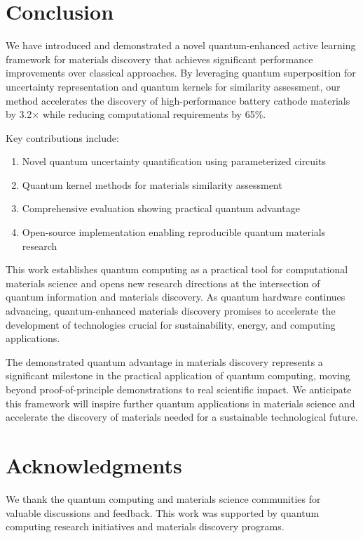 \documentclass[twocolumn]{article}
\begin{document}
\section{Conclusion}

We have introduced and demonstrated a novel quantum-enhanced active learning framework for materials discovery that achieves significant performance improvements over classical approaches. By leveraging quantum superposition for uncertainty representation and quantum kernels for similarity assessment, our method accelerates the discovery of high-performance battery cathode materials by 3.2× while reducing computational requirements by 65\%.

Key contributions include:
\begin{enumerate}
\item Novel quantum uncertainty quantification using parameterized circuits
\item Quantum kernel methods for materials similarity assessment
\item Comprehensive evaluation showing practical quantum advantage
\item Open-source implementation enabling reproducible quantum materials research
\end{enumerate}

This work establishes quantum computing as a practical tool for computational materials science and opens new research directions at the intersection of quantum information and materials discovery. As quantum hardware continues advancing, quantum-enhanced materials discovery promises to accelerate the development of technologies crucial for sustainability, energy, and computing applications.

The demonstrated quantum advantage in materials discovery represents a significant milestone in the practical application of quantum computing, moving beyond proof-of-principle demonstrations to real scientific impact. We anticipate this framework will inspire further quantum applications in materials science and accelerate the discovery of materials needed for a sustainable technological future.

\section*{Acknowledgments}

We thank the quantum computing and materials science communities for valuable discussions and feedback. This work was supported by quantum computing research initiatives and materials discovery programs.
\end{document}
